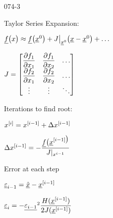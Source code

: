 \begin{mitframe}{074-3}
 \begin{listone}
	\item Taylor Series Expansion:
    	\begin{listtwo}
        	\item $\uline{\fug}\big(\disp\big)\approx\uline{\fug}\big(\uline{\disp}^{\init}\big)+J\big|_{\uline{\disp}^{\init}}\big(\uline{\disp}-\uline{\disp}^{\init}\big)+\ldots$
            \item $J=\begin{bmatrix}\dfrac{\partial\fug_1}{\partial\disp_1} & \dfrac{\partial\fug_1}{\partial\disp_2}& \ldots\\ \dfrac{\partial\fug_2}{\partial\disp_1}& \dfrac{\partial\fug_2}{\partial\disp_2}&\ldots\\   \vdots & \vdots &\ddots  \end{bmatrix}$
        \end{listtwo}
	\item Iterations to find root:
    	\begin{listtwo}
    		\item $\disp^{[\state]}=\disp^{[\state-1]}+\iipf\disp^{[\state-1]}$
            \item $\iipf\disp^{[\state-1]}=-\dfrac{\uline{\fug}\big(\uline{\disp}^{[\state-1]\big)}}{J|_{\disp^{\state-1}}}$
            \end{listtwo}
    \item Error at each step
    		\begin{listtwo}
            	\item $\uline{\varepsilon}_{\state-1}=\uline{\hat{\disp}}-\uline{\disp}^{[\state-1]}$
                \item $\uline{\varepsilon}_{\state}=-\uline{\varepsilon_{\state-1}}^2\dfrac{\enthalpy(\uline{\disp}^{[\state-1]})}{2J(\uline{\disp}^{[\state-1]})}$
            \end{listtwo}
\end{listone}   
\end{mitframe}
